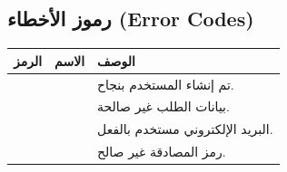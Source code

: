 \documentclass[11pt,a4paper]{article}
\begin{document}
\subsection{رموز الأخطاء (Error Codes)}
\begin{table}[H]
\centering
\renewcommand{\arraystretch}{1.3}
\begin{tabularx}{\textwidth}{C{2cm} L{4cm} X}
\toprule
\textbf{الرمز} & \textbf{الاسم} & \textbf{الوصف} \\
\midrule
{} &             & تم إنشاء المستخدم بنجاح. \\
 &         & بيانات الطلب غير صالحة. \\
 &            & البريد الإلكتروني مستخدم بالفعل. \\
 &        & رمز المصادقة غير صالح. \\
\bottomrule
\end{tabularx}
\end{table}
\end{document}
